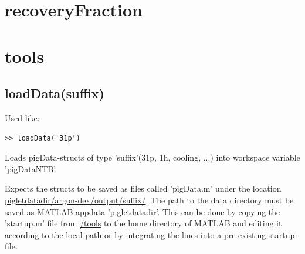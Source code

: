 \documentclass[10pt, a4paper]{article}
\begin{document}
\section{recoveryFraction}

\section{tools}
\subsection{loadData(suffix)}
Used like:

\begin{lstlisting}
>> loadData('31p')
\end{lstlisting}

Loads pigData-structs of type 'suffix'(31p, 1h, cooling, ...) into workspace variable 'pigDataNTB'. 

Expects the structs to be saved as files called 'pigData.m' under the location \url{pigletdatadir/argon-dex/output/suffix/}. The path to the data directory must be saved as MATLAB-appdata 'pigletdatadir'. This can be done by copying the 'startup.m' file from \url{/tools} to the home directory of MATLAB and editing it according to the local path or by integrating the lines into a pre-existing startup-file. 
\end{document}
